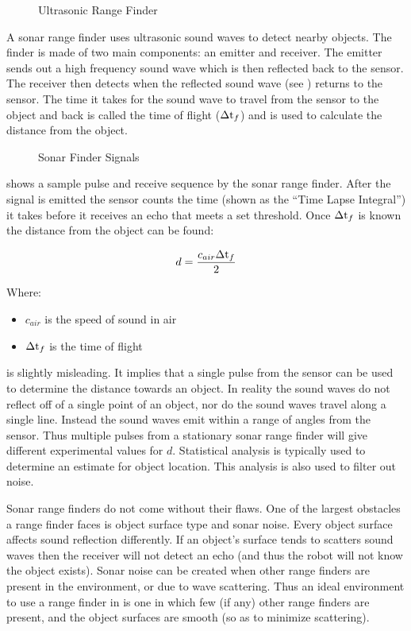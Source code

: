 \documentclass[main.tex]{subfiles}
\begin{document}
\begin{figure}[h]
	\begin{center}
		
	\end{center}
	\caption{Ultrasonic Range Finder}
	\label{fig:ultraSon}
\end{figure}

A sonar range finder uses ultrasonic sound waves to detect nearby objects. The
finder is made of two main components: an emitter and receiver. The emitter
sends out a high frequency sound wave which is then reflected back to the
sensor. The receiver then detects when the reflected sound wave (see
) returns to the sensor. The time it takes for the sound wave
to travel from the sensor to the object and back is called the time of flight
($\Delta\mathrm{t}_f$) and is used to calculate the distance from the object. 

\begin{figure}[H]
	\begin{center}
		
	\end{center}
	\caption{Sonar Finder Signals}
	\label{fig:ultraSig}
\end{figure}

 shows a sample pulse and receive sequence by the sonar range
finder. After the signal is emitted the sensor counts the time (shown as the
``Time Lapse Integral'') it takes before it receives an echo that meets a set
threshold. Once $\Delta\mathrm{t}_f$ is known the distance from the object can be found: 

\begin{equation}
\label{eq:ultDEq}
d = \frac{c_{air}\Delta\mathrm{t}_f}{2}
\end{equation}

Where: 
\begin{itemize}
\item $c_{air}$ is the speed of sound in air
\item $\Delta\mathrm{t}_f$ is the time of flight
\end{itemize}

 is slightly misleading. It implies that a single pulse from the
sensor can be used to determine the distance towards an object. In reality the
sound waves do not reflect off of a single point of an object, nor do the sound
waves travel along a single line. Instead the sound waves emit within a range of
angles from the sensor. Thus multiple pulses from a stationary sonar range
finder will give different experimental values for $d$. Statistical analysis is
typically used to determine an estimate for object location. This analysis is
also used to filter out noise.

Sonar range finders do not come without their flaws. One of the largest
obstacles a range finder faces is object surface type and sonar noise. Every
object surface affects sound reflection differently. If an object's surface
tends to scatters sound waves then the receiver will not detect an echo (and
thus the robot will not know the object exists). Sonar noise can be created when
other range finders are present in the environment, or due to wave scattering.
Thus an ideal environment to use a range finder in is one in which few (if any)
other range finders are present, and the object surfaces are smooth (so as to
minimize scattering). 
\end{document}
